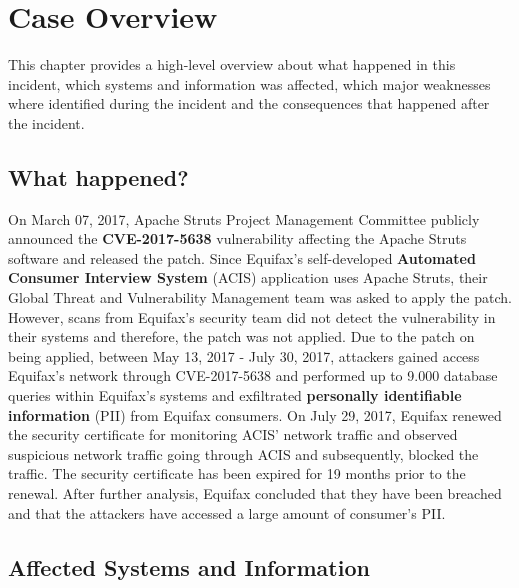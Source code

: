 \chapter{Case Overview}

This chapter provides a high-level overview about what happened in this incident, which systems and information was affected, which major weaknesses where identified during the incident and the consequences that happened after the incident.

\section{What happened?}

On March 07, 2017, Apache Struts Project Management Committee publicly announced the \textbf{ CVE-2017-5638} vulnerability affecting the Apache Struts software and released the patch.
\newline
Since Equifax's self-developed \textbf{Automated Consumer Interview System} (ACIS) application uses Apache Struts, their Global Threat and Vulnerability Management team was asked to apply the patch.
\newline
However, scans from Equifax's security team did not detect the vulnerability in their systems and therefore, the patch was not applied.
\newline
Due to the patch on being applied, between May 13, 2017 - July 30, 2017, attackers gained access Equifax's network through CVE-2017-5638 and performed up to 9.000 database queries within Equifax's systems and exfiltrated \textbf{personally identifiable information} (PII) from Equifax consumers.
\newline
On July 29, 2017, Equifax renewed the security certificate for monitoring ACIS' network traffic and observed suspicious network traffic going through ACIS and subsequently, blocked the traffic. The security certificate has been expired for 19 months prior to the renewal.
\newline
After further analysis, Equifax concluded that they have been breached and that the attackers have accessed a large amount of consumer's PII.

\section{Affected Systems and Information}

